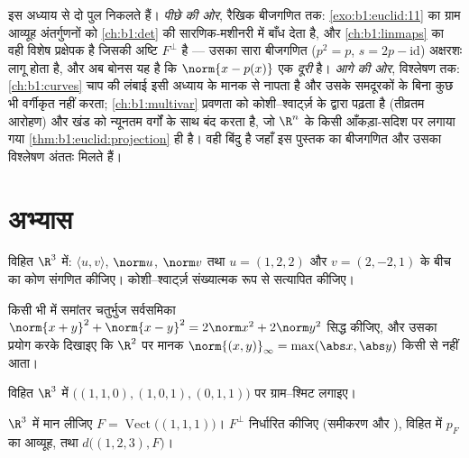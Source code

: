 \begin{remark}[पुस्तक 3 के भीतर के परिदृश्य]
\label{rem:b1:euclid:perspectives}
इस अध्याय से दो पुल निकलते हैं। \emph{पीछे की ओर}, रैखिक बीजगणित तक:
\cref{exo:b1:euclid:11} का ग्राम आव्यूह अंतर्गुणनों को \cref{ch:b1:det} की
सारणिक-मशीनरी में बाँध देता है, और  \cref{ch:b1:linmaps} का
वही विशेष प्रक्षेपक है जिसकी अष्टि $F^\perp$ है --- उसका सारा बीजगणित ($p^2
= p$, $s = 2p - \mathrm{id}$) अक्षरशः लागू होता है, और अब बोनस यह है कि
$\norm{x - p(x)}$ एक \emph{दूरी} है। \emph{आगे की ओर}, विश्लेषण तक:
\cref{ch:b1:curves} चाप की लंबाई इसी अध्याय के मानक से नापता है और उसके
समदूरकों के बिना कुछ भी वर्गीकृत नहीं करता; \cref{ch:b1:multivar} प्रवणता को
कोशी--श्वार्ट्ज़ के द्वारा पढ़ता है (तीव्रतम आरोहण) और खंड को न्यूनतम वर्गों
के साथ बंद करता है, जो $\R^n$ के किसी आँकड़ा-सदिश पर लगाया गया
\cref{thm:b1:euclid:projection} ही है।  वही बिंदु है जहाँ इस पुस्तक
का बीजगणित और उसका विश्लेषण अंततः मिलते हैं।
\end{remark}

\section{अभ्यास}

\begin{exercise}[$\star$]\label{exo:b1:euclid:1}
विहित $\R^3$ में: $\langle u, v\rangle$, $\norm u$, $\norm v$ तथा $u = (1,
2, 2)$ और $v = (2, -2, 1)$ के बीच का कोण संगणित कीजिए। कोशी--श्वार्ट्ज़
संख्यात्मक रूप से सत्यापित कीजिए।
\end{exercise}

\begin{exercise}[$\star$]\label{exo:b1:euclid:2}
किसी भी  में समांतर चतुर्भुज सर्वसमिका $\norm{x+y}^2 +
\norm{x-y}^2 = 2\norm x^2 + 2\norm y^2$ सिद्ध कीजिए, और उसका प्रयोग करके
दिखाइए कि $\R^2$ पर  मानक $\norm{(x,y)}_\infty = \max(\abs x, \abs y)$
किसी  से नहीं आता।
\end{exercise}

\begin{exercise}[$\star$]\label{exo:b1:euclid:3}
विहित $\R^3$ में $\bigl((1,1,0), (1,0,1), (0,1,1)\bigr)$ पर ग्राम--श्मिट
लगाइए।
\end{exercise}

\begin{exercise}[$\star$]\label{exo:b1:euclid:4}
$\R^3$ में मान लीजिए $F = \operatorname{Vect}\bigl((1,1,1)\bigr)$। $F^\perp$
निर्धारित कीजिए (समीकरण और ), विहित  में $p_F$ का आव्यूह, तथा
$d\bigl((1, 2, 3), F\bigr)$।
\end{exercise}

